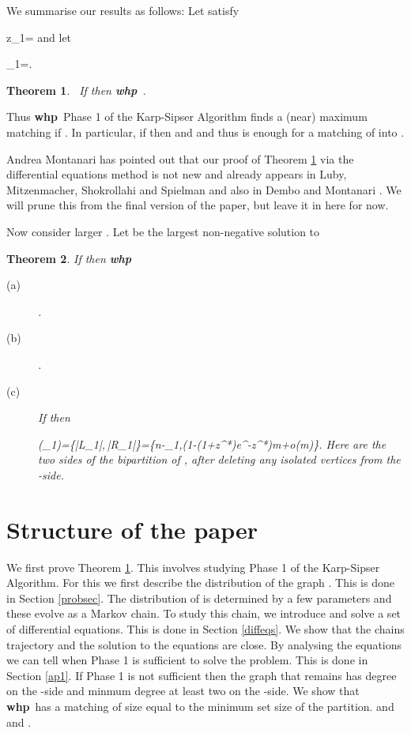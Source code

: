 \documentclass[11pt]{article}
\def\a{\alpha}
\def\G{\Gamma}
\def\m{\mu}
\def\t{\tau}
\def\whp{{\bf whp}}
\newcommand{\set}[1]{\left\{#1\right\}}
\newtheorem{theorem}{Theorem}
\newcommand{\beq}[1]{}
\begin{document}
We summarise our results as follows: Let  satisfy 
\beq{zaa}
z_1=
\eeq
and let
\beq{azaa}
\a_1=.
\eeq
\begin{theorem}\label{th1}\ 
If  then \whp\ .
\end{theorem}
Thus \whp\ Phase 1 of the Karp-Sipser Algorithm finds a (near) maximum matching if .
In particular, if  then  and  and thus  is enough for a
matching of  into .

Andrea Montanari has pointed out that our proof of Theorem \ref{th1} via the differential equations method is not
new and already appears in Luby, Mitzenmacher, Shokrollahi and Spielman \cite{LMSS} and also in Dembo and Montanari \cite{DeMo}.
We will prune this from the final version of the paper, but leave it in here for now.

Now consider larger . Let  be the largest non-negative solution to 

\begin{theorem}\label{th2}
If  then \whp
\begin{description}
\item[(a)] .
\item[(b)] .
\item[(c)] If  then
\beq{match}
\m(\G_1)=\min\set{|L_1|,\,|R_1|}=\min\set{n-\t_1,(1-(1+z^*)e^{-z^*})m+o(m)}.
\eeq
Here  are the two sides of the bipartition of , after deleting any isolated vertices from the 
-side.
\end{description}
\end{theorem}
\section{Structure of the paper}
We first prove Theorem \ref{th1}. This involves studying Phase 1 of the Karp-Sipser Algorithm. For this we first describe 
the distribution of the graph . This is done in Section \ref{probsec}. The distribution of  is determined
by a few parameters and these evolve as a Markov chain. To study this chain, we introduce and solve a set of differential
equations. This is done in Section \ref{diffeqs}. We show that the chains trajectory and the solution to the equations are close.
By analysing the equations we can tell when Phase 1 is sufficient to solve the problem. This is done in Section \ref{ap1}.
If Phase 1 is not sufficient then the graph  that remains has degree  on the -side and minmum degree at least two
on the -side. We show that \whp\  has a matching of size equal to the minimum set size of the partition. 
\cite{DMP} and \cite{DM} and \cite{FP}. 
\end{document}
